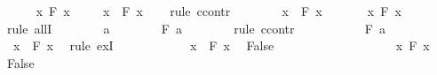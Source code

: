 \begin{isabellebody}
%
\isadelimproof
%
\endisadelimproof
%
\isatagproof
{}\isamarkupfalse%
\isanewline
\ \ \isamarkupfalse%
\ {\isachardoublequoteopen}{\isasymnot}\ {\isacharparenleft}{\isasymforall}\ x{\isachardot}\ F\ x{\isacharparenright}{\isachardoublequoteclose}\isanewline
\ \ \isamarkupfalse%
\ {\isachardoublequoteopen}{\isacharparenleft}{\isasymexists}\ x{\isachardot}\ {\isasymnot}\ F\ x{\isacharparenright}{\isachardoublequoteclose}\isanewline
\ \ \isamarkupfalse%
\ {\isacharparenleft}rule\ ccontr{\isacharparenright}\isanewline
\ \ \ \ \isamarkupfalse%
\ {\isachardoublequoteopen}{\isasymnot}\ {\isacharparenleft}{\isasymexists}\ x{\isachardot}\ {\isasymnot}\ F\ x{\isacharparenright}{\isachardoublequoteclose}\isanewline
\ \ \ \ \isamarkupfalse%
\ {\isachardoublequoteopen}{\isasymforall}\ x{\isachardot}\ F\ x{\isachardoublequoteclose}\isanewline
\ \ \ \ \isamarkupfalse%
\ {\isacharparenleft}rule\ allI{\isacharparenright}\isanewline
\ \ \ \ \ \ \isamarkupfalse%
\ a\isanewline
\ \ \ \ \ \ \isamarkupfalse%
\ {\isachardoublequoteopen}F\ a{\isachardoublequoteclose}\isanewline
\ \ \ \ \ \ \isamarkupfalse%
\ {\isacharparenleft}rule\ ccontr{\isacharparenright}\isanewline
\ \ \ \ \ \ \ \ \isamarkupfalse%
\ {\isachardoublequoteopen}{\isasymnot}\ F\ a{\isachardoublequoteclose}\isanewline
\ \ \ \ \ \ \ \ \isamarkupfalse%
\ {\isachardoublequoteopen}{\isasymexists}\ x{\isachardot}\ {\isasymnot}\ F\ x{\isachardoublequoteclose}\ \isamarkupfalse%
\ {\isacharparenleft}rule\ exI{\isacharparenright}\isanewline
\ \ \ \ \ \ \ \ \isamarkupfalse%
\ {\isacharbackquoteopen}{\isasymnot}\ {\isacharparenleft}{\isasymexists}\ x{\isachardot}\ {\isasymnot}\ F\ x{\isacharparenright}{\isacharbackquoteclose}\ \isamarkupfalse%
\ {\isachardoublequoteopen}False{\isachardoublequoteclose}\isacommand{{\isachardot}{\isachardot}}\isamarkupfalse%
\isanewline
\ \ \ \ \ \ \isamarkupfalse%
\isanewline
\ \ \ \ \isamarkupfalse%
\isanewline
\ \ \ \ \isamarkupfalse%
\ {\isacharbackquoteopen}{\isasymnot}\ {\isacharparenleft}{\isasymforall}\ x{\isachardot}\ F\ x{\isacharparenright}{\isacharbackquoteclose}\ \isamarkupfalse%
\ {\isachardoublequoteopen}False{\isachardoublequoteclose}\isacommand{{\isachardot}{\isachardot}}\isamarkupfalse%
\isanewline
\ \ \isamarkupfalse%
\isanewline
{}\isamarkupfalse%

\end{isabellebody}
